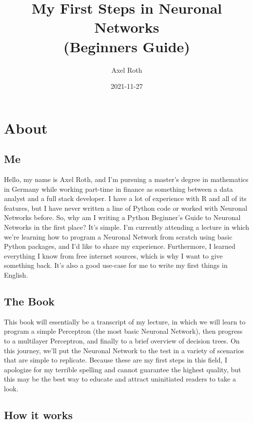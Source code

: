 \documentclass[
]{book}
\title{My First Steps in Neuronal Networks\\
(Beginners Guide)}
\author{Axel Roth}
\date{2021-11-27}
\begin{document}
\maketitle

{
\setcounter{tocdepth}{1}
\tableofcontents
}
\hypertarget{about}{%
\chapter{About}\label{about}}

\hypertarget{me}{%
\section{Me}\label{me}}

Hello, my name is Axel Roth, and I'm pursuing a master's degree in mathematics in Germany while working part-time in finance as something between a data analyst and a full stack developer. I have a lot of experience with R and all of its features, but I have never written a line of Python code or worked with Neuronal Networks before. So, why am I writing a Python Beginner's Guide to Neuronal Networks in the first place? It's simple. I'm currently attending a lecture in which we're learning how to program a Neuronal Network from scratch using basic Python packages, and I'd like to share my experience. Furthermore, I learned everything I know from free internet sources, which is why I want to give something back. It's also a good use-case for me to write my first things in English.

\hypertarget{the-book}{%
\section{The Book}\label{the-book}}

This book will essentially be a transcript of my lecture, in which we will learn to program a simple Perceptron (the most basic Neuronal Network), then progress to a multilayer Perceptron, and finally to a brief overview of decision trees. On this journey, we'll put the Neuronal Network to the test in a variety of scenarios that are simple to replicate. Because these are my first steps in this field, I apologize for my terrible spelling and cannot guarantee the highest quality, but this may be the best way to educate and attract uninitiated readers to take a look.

\hypertarget{how-it-works}{%
\section{How it works}\label{how-it-works}}
\end{document}
